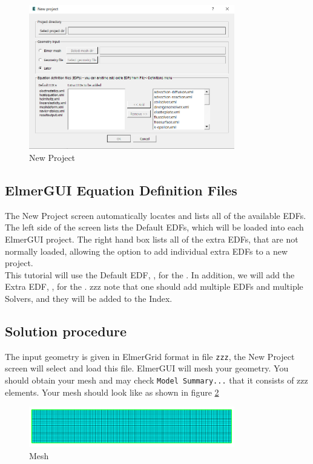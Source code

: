 \begin{figure}[H]
\centering
\includegraphics[width=0.8\textwidth]{new_project.png}
\caption{New Project}\label{fg:new_project}
\end{figure}  

\subsection*{ElmerGUI Equation Definition Files}

The New Project screen automatically locates and lists all of the available EDFs.  The left side of the screen lists the Default EDFs, which will be loaded into each ElmerGUI project.  The right hand box lists all of the extra EDFs, that are not normally loaded, allowing the option to add individual extra EDFs to a new project.\\

This tutorial will use the Default EDF, \texttt{}, for the .  In addition, we will add the Extra EDF,  \texttt{}, for the .   zzz note that one should add multiple EDFs and multiple Solvers, and they will be added to the Index.

\subsection*{Solution procedure}

The input geometry is given in ElmerGrid format in file \texttt{zzz}, the New Project screen will select and load this file.  ElmerGUI will mesh your geometry.  You should obtain your mesh and may check \texttt{Model Summary...} that it consists of zzz elements.  Your mesh should look like as shown in figure \ref{fg:mesh}

\begin{figure}[H]
\centering
\includegraphics[width=0.8\textwidth]{mesh}
\caption{Mesh}\label{fg:mesh}
\end{figure}


